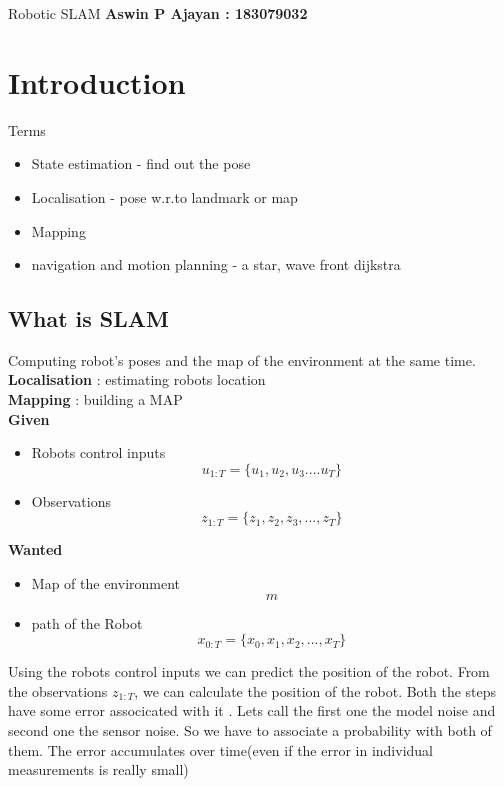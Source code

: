 \documentclass{article}
\begin{document}
Robotic SLAM 
\textbf{Aswin P Ajayan : 183079032} %

\tableofcontents
\newpage
\section{Introduction}
Terms 

\begin{itemize}
    \item State estimation - find out the pose 
    \item Localisation - pose w.r.to landmark or map
    \item Mapping 
   \item navigation and motion planning - a star, wave front dijkstra 
\end{itemize}

\subsection{What is SLAM}
    Computing robot's poses and the map of the environment at the 
    same time.
\textbf{Localisation} : estimating robots location\\ 
\textbf{Mapping}      : building a MAP\\

\textbf{Given}

\begin{itemize}
    \item Robots control inputs   $$u_{1:T} = \{u_1,u_2,u_3....u_T\}$$
    \item Observations $$z_{1:T} = \{z_1,z_2,z_3,...,z_T\}$$
\end{itemize}

\textbf{Wanted}
\begin{itemize}
    \item Map of the environment $$m$$
    \item path of the Robot $$x_{0:T} = \{x_0,x_1,x_2,...,x_T\}$$
\end{itemize}

Using the robots control inputs we can predict the position of the robot.
From the observations $z_{1:T}$, we can calculate the position of the robot. 
Both the steps have some error associcated with it . Lets call the first
one the model noise and second one the sensor noise. So we have to associate 
a probability with both of them. The error accumulates over time(even if the
error in individual measurements is really small)\\
\end{document}
